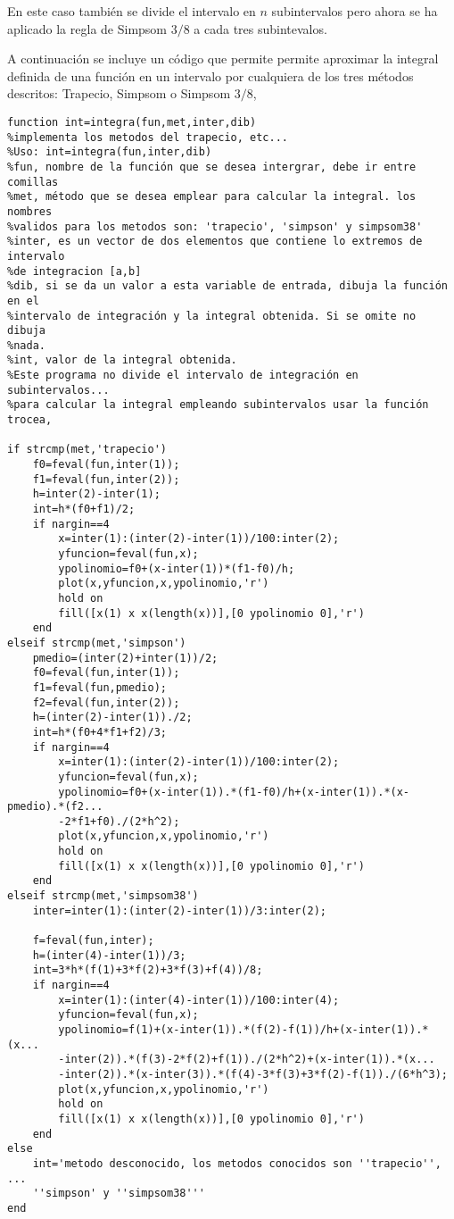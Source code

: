 En este caso también se divide el intervalo en $n$ subintervalos pero ahora se ha aplicado la regla de Simpsom $3/8$ a cada tres subintevalos.

A continuación se incluye un código que permite permite aproximar la integral definida de una función en un intervalo por cualquiera de los tres métodos descritos: Trapecio, Simpsom o Simpsom $3/8$,

\begin{verbatim}
function int=integra(fun,met,inter,dib)
%implementa los metodos del trapecio, etc...
%Uso: int=integra(fun,inter,dib)
%fun, nombre de la función que se desea intergrar, debe ir entre comillas
%met, método que se desea emplear para calcular la integral. los nombres
%validos para los metodos son: 'trapecio', 'simpson' y simpsom38'
%inter, es un vector de dos elementos que contiene lo extremos de intervalo
%de integracion [a,b]
%dib, si se da un valor a esta variable de entrada, dibuja la función en el
%intervalo de integración y la integral obtenida. Si se omite no dibuja
%nada.
%int, valor de la integral obtenida.
%Este programa no divide el intervalo de integración en subintervalos...
%para calcular la integral empleando subintervalos usar la función trocea,

if strcmp(met,'trapecio')
    f0=feval(fun,inter(1));
    f1=feval(fun,inter(2));
    h=inter(2)-inter(1);
    int=h*(f0+f1)/2;
    if nargin==4
        x=inter(1):(inter(2)-inter(1))/100:inter(2);
        yfuncion=feval(fun,x);
        ypolinomio=f0+(x-inter(1))*(f1-f0)/h;
        plot(x,yfuncion,x,ypolinomio,'r')
        hold on
        fill([x(1) x x(length(x))],[0 ypolinomio 0],'r') 
    end
elseif strcmp(met,'simpson')
    pmedio=(inter(2)+inter(1))/2;
    f0=feval(fun,inter(1));
    f1=feval(fun,pmedio);
    f2=feval(fun,inter(2));
    h=(inter(2)-inter(1))./2;
    int=h*(f0+4*f1+f2)/3;
    if nargin==4
        x=inter(1):(inter(2)-inter(1))/100:inter(2);
        yfuncion=feval(fun,x);
        ypolinomio=f0+(x-inter(1)).*(f1-f0)/h+(x-inter(1)).*(x-pmedio).*(f2...
        -2*f1+f0)./(2*h^2);
        plot(x,yfuncion,x,ypolinomio,'r')
        hold on
        fill([x(1) x x(length(x))],[0 ypolinomio 0],'r') 
    end        
elseif strcmp(met,'simpsom38')
    inter=inter(1):(inter(2)-inter(1))/3:inter(2);

    f=feval(fun,inter);
    h=(inter(4)-inter(1))/3;
    int=3*h*(f(1)+3*f(2)+3*f(3)+f(4))/8;
    if nargin==4
        x=inter(1):(inter(4)-inter(1))/100:inter(4);
        yfuncion=feval(fun,x);
        ypolinomio=f(1)+(x-inter(1)).*(f(2)-f(1))/h+(x-inter(1)).*(x...
        -inter(2)).*(f(3)-2*f(2)+f(1))./(2*h^2)+(x-inter(1)).*(x...
        -inter(2)).*(x-inter(3)).*(f(4)-3*f(3)+3*f(2)-f(1))./(6*h^3);
        plot(x,yfuncion,x,ypolinomio,'r')
        hold on
        fill([x(1) x x(length(x))],[0 ypolinomio 0],'r') 
    end
else
    int='metodo desconocido, los metodos conocidos son ''trapecio'', ...
    ''simpson' y ''simpsom38'''
end
\end{verbatim}

